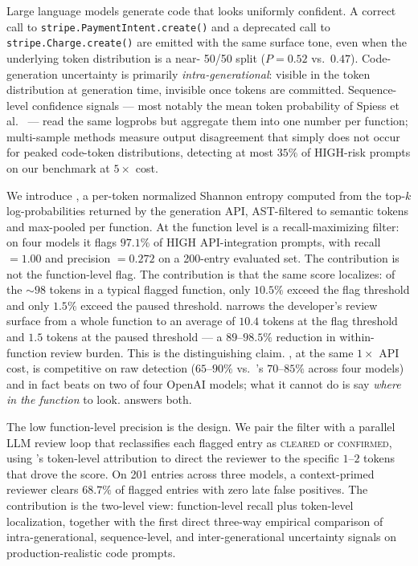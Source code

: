 Large language models generate code that looks uniformly confident. A
correct call to \texttt{stripe.PaymentIntent.create()} and a deprecated
call to \texttt{stripe.Charge.create()} are emitted with the same
surface tone, even when the underlying token distribution is a near-%
50/50 split ($P=0.52$ vs.\ $0.47$). Code-generation uncertainty is
primarily \emph{intra-generational}: visible in the token distribution
at generation time, invisible once tokens are committed. Sequence-level
confidence signals --- most notably the mean token probability \papg
of Spiess et al.~\cite{spiess2025calibration} --- read the same
logprobs but aggregate them into one number per function; multi-sample
methods measure output disagreement that simply does not occur for
peaked code-token distributions, detecting at most $35\%$ of HIGH-risk
prompts on our benchmark at $5\times$ cost.

We introduce \eps, a per-token normalized Shannon entropy computed from
the top-$k$ log-probabilities returned by the generation API,
AST-filtered to semantic tokens and max-pooled per function. At the
function level \eps is a recall-maximizing filter: on four models it
flags $97.1\%$ of HIGH API-integration prompts, with recall $=1.00$ and
precision $=0.272$ on a 200-entry evaluated set. The contribution is
not the function-level flag. The contribution is that the same score
localizes: of the $\sim 98$ tokens in a typical flagged function, only
$10.5\%$ exceed the flag threshold and only $1.5\%$ exceed the paused
threshold. \eps narrows the developer's review surface from a whole
function to an average of $10.4$ tokens at the flag threshold and
$1.5$ tokens at the paused threshold --- a $89$--$98.5\%$ reduction in
within-function review burden. This is the distinguishing claim.
\papg, at the same $1\times$ API cost, is competitive on raw detection
($65$--$90\%$ vs.\ \eps's $70$--$85\%$ across four models) and in fact
beats \eps on two of four OpenAI models; what it cannot do is say
\emph{where in the function} to look. \eps answers both.

The low function-level precision is the design. We pair the filter
with a parallel LLM review loop that reclassifies each flagged entry
as \textsc{cleared} or \textsc{confirmed}, using \eps's token-level
attribution to direct the reviewer to the specific $1$--$2$ tokens
that drove the score. On 201 entries across three models, a
context-primed reviewer clears $68.7\%$ of flagged entries with zero
late false positives. The contribution is the two-level view:
function-level recall plus token-level localization, together with
the first direct three-way empirical comparison of intra-generational,
sequence-level, and inter-generational uncertainty signals on
production-realistic code prompts.
